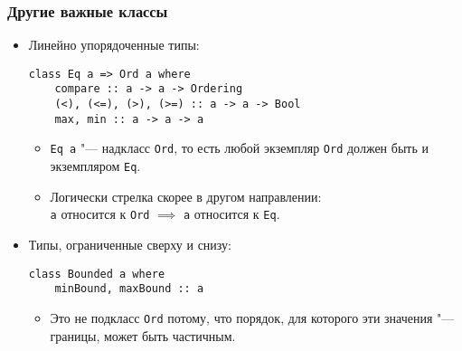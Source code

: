 \documentclass[10pt]{beamer}
\begin{document}
\begin{frame}[fragile]
  \frametitle{Другие важные классы}
  \begin{itemize}
    \item
          Линейно упорядоченные типы:
          \begin{lstlisting}
class Eq a => Ord a where
    compare :: a -> a -> Ordering
    (<), (<=), (>), (>=) :: a -> a -> Bool 
    max, min :: a -> a -> a
\end{lstlisting}
          \begin{itemize}
            \item \lstinline|Eq a| "--- надкласс \lstinline|Ord|, то есть любой экземпляр \lstinline|Ord| должен быть и экземпляром \lstinline|Eq|. \pause
            \item Логически стрелка скорее в другом направлении:\\ \lstinline|a| относится к \lstinline|Ord| $\implies$ \lstinline|a| относится к \lstinline|Eq|.
          \end{itemize}
          \pause
    \item
          Типы, ограниченные сверху и снизу:
          \begin{lstlisting}
class Bounded a where
    minBound, maxBound :: a 
\end{lstlisting}
          \begin{itemize}
            \item Это не подкласс \lstinline|Ord| потому, что порядок, для которого эти значения "--- границы, может быть частичным.
          \end{itemize}
  \end{itemize}
\end{frame}
\end{document}
